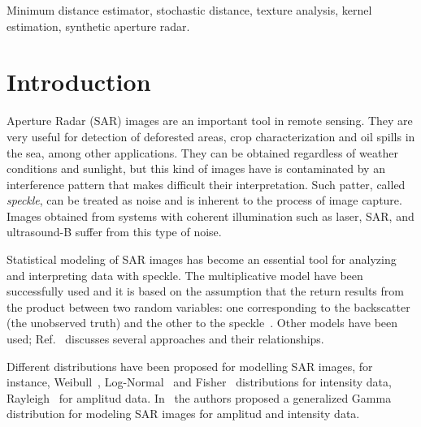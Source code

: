 \documentclass[technote,onecolumn,draftcls,12pt]{IEEEtran}
\numberwithin{equation}{section}
\begin{document}
\begin{abstract}
\end{abstract}

\begin{keywords}
Minimum distance estimator, stochastic distance, texture analysis, kernel estimation, synthetic aperture radar.
\end{keywords}

\IEEEpeerreviewmaketitle

\section{Introduction}
\label{intro}
 Aperture Radar (SAR) images are an important tool in
remote sensing. 
They are very useful for detection of deforested areas, crop characterization and oil spills in the sea, among other applications. 
%
They can be obtained regardless of weather conditions and sunlight, but this kind of images have is contaminated by an interference pattern that makes difficult their interpretation. 
Such patter, called \textit{speckle}, can be treated as noise and is inherent to the process of image capture. 
Images obtained from systems with coherent illumination such as laser, SAR, and ultrasound-B suffer from this type of noise.

Statistical modeling of SAR images has become an essential tool for analyzing and interpreting data with speckle. 
The multiplicative model have been successfully used and it is based on the assumption that the return results from the product between two random variables: one corresponding to the backscatter (the unobserved truth) and the other to the speckle~\cite{oliverquegan98}. 
Other models have been used; Ref.~\cite{Gao2010} discusses several approaches and their relationships.

Different distributions have been proposed for modelling SAR images, for instance, Weibull~\cite{Oliver1993}, Log-Normal~\cite{oliverquegan98} and Fisher~\cite{Tupin2004} distributions for intensity data, Rayleigh~\cite{oliverquegan98} for amplitud data. 
In~\cite{Li2011} the authors proposed a generalized Gamma distribution for modeling SAR images for amplitud and intensity data.
\end{document}

